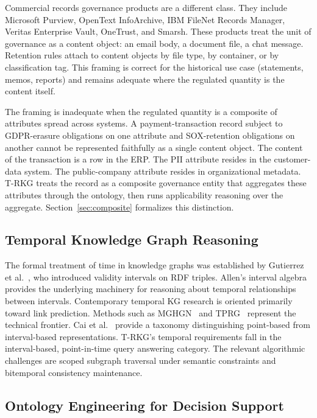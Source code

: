 \documentclass{ieeeaccess}
\begin{document}
Commercial records governance products are a different class. They include Microsoft Purview, OpenText InfoArchive, IBM FileNet Records Manager, Veritas Enterprise Vault, OneTrust, and Smarsh. These products treat the unit of governance as a content object: an email body, a document file, a chat message. Retention rules attach to content objects by file type, by container, or by classification tag. This framing is correct for the historical use case (statements, memos, reports) and remains adequate where the regulated quantity is the content itself.

The framing is inadequate when the regulated quantity is a composite of attributes spread across systems. A payment-transaction record subject to GDPR-erasure obligations on one attribute and SOX-retention obligations on another cannot be represented faithfully as a single content object. The content of the transaction is a row in the ERP. The PII attribute resides in the customer-data system. The public-company attribute resides in organizational metadata. T-RKG treats the record as a composite governance entity that aggregates these attributes through the ontology, then runs applicability reasoning over the aggregate. Section~\ref{sec:composite} formalizes this distinction.

\subsection{Temporal Knowledge Graph Reasoning}

The formal treatment of time in knowledge graphs was established by Gutierrez et al.~\cite{gutierrez2007}, who introduced validity intervals on RDF triples. Allen's interval algebra~\cite{allen1983} provides the underlying machinery for reasoning about temporal relationships between intervals. Contemporary temporal KG research is oriented primarily toward link prediction. Methods such as MGHGN~\cite{mghgn2025} and TPRG~\cite{tprg2023} represent the technical frontier. Cai et al.~\cite{cai2023} provide a taxonomy distinguishing point-based from interval-based representations. T-RKG's temporal requirements fall in the interval-based, point-in-time query answering category. The relevant algorithmic challenges are scoped subgraph traversal under semantic constraints and bitemporal consistency maintenance.

\subsection{Ontology Engineering for Decision Support}
\end{document}
